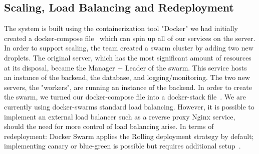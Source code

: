\subsection{Scaling, Load Balancing and Redeployment}

The system is built using the containerization tool "Docker" we had initially created a docker-compose file~\cite{dockerComposeDefault} which can spin up all of our services on the server. In order to support scaling, the team created a swarm cluster by adding two new droplets. The original server, which has the most significant amount of resources at its disposal, became the Manager + Leader of the swarm. This service hosts an instance of the backend, the database, and logging/monitoring. The two new servers, the "workers", are running an instance of the backend. In order to create the swarm, we turned our docker-compose file into a docker-stack file~\cite{dockerCompose}. We are currently using docker-swarms standard load balancing. However, it is possible to implement an external load balancer such as a reverse proxy Nginx service, should the need for more control of load balancing arise. In terms of redeployment: Docker Swarm applies the Rolling deployment strategy by default; implementing canary or blue-green is possible but requires additional setup~\cite{colorfulDeployments}.